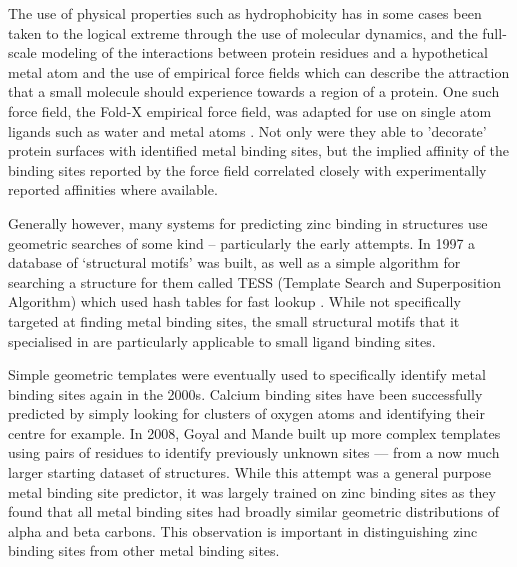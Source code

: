 The use of physical properties such as hydrophobicity has in some cases been taken to the logical extreme through the use of molecular dynamics, and the full-scale modeling of the interactions between protein residues and a hypothetical metal atom and the use of empirical force fields which can describe the attraction that a small molecule should experience towards a region of a protein. One such force field, the Fold-X empirical force field, was adapted for use on single atom ligands such as water and metal atoms \cite{schymkowitz2005}. Not only were they able to 'decorate' protein surfaces with identified metal binding sites, but the implied affinity of the binding sites reported by the force field correlated closely with experimentally reported affinities where available.

Generally however, many systems for predicting zinc binding in structures use geometric searches of some kind -- particularly the early attempts. In 1997 a database of `structural motifs' was built, as well as a simple algorithm for searching a structure for them called TESS (Template Search and Superposition Algorithm) which used hash tables for fast lookup \cite{wallace1997tess}. While not specifically targeted at finding metal binding sites, the small structural motifs that it specialised in are particularly applicable to small ligand binding sites.

Simple geometric templates were eventually used to specifically identify metal binding sites again in the 2000s. Calcium binding sites have been successfully predicted by simply looking for clusters of oxygen atoms and identifying their centre \cite{deng2006} for example. In 2008, Goyal and Mande built up more complex templates using pairs of residues to identify previously unknown sites --- from a now much larger starting dataset of structures. While this attempt was a general purpose metal binding site predictor, it was largely trained on zinc binding sites as they found that all metal binding sites had broadly similar geometric distributions of alpha and beta carbons. This observation is important in distinguishing zinc binding sites from other metal binding sites.

